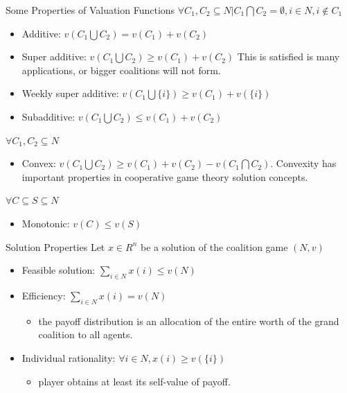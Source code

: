 \documentclass{beamer}
\begin{document}
\begin{frame}{Some Properties of Valuation Functions}
    $\forall C_1,C_2 \subseteq N | C_1 \bigcap C_2 = \emptyset, i \in N, i \notin C_1$
    \begin{itemize}
        \item {\color{blue} Additive:} $v(C_1 \bigcup C_2) = v(C_1) + v(C_2)$
        \item {\color{blue} Super additive:} $v(C_1 \bigcup C_2) \geq v(C_1) + v(C_2)$ This is satisfied is many applications, or bigger coalitions will not form.
        \item {\color{blue} Weekly super additive:} $v(C_1 \bigcup \{i\}) \geq v(C_1) + v(\{i\})$
        \item {\color{red} Subadditive:} $v(C_1 \bigcup C_2) \leq v(C_1) + v(C_2)$
    \end{itemize}

    $\forall C_1,C_2 \subseteq N$
    \begin{itemize}
        \item {\color{blue} Convex:} $v(C_1 \bigcup C_2) \geq v(C_1) + v(C_2) - v(C_1 \bigcap C_2)$. Convexity has important properties in cooperative game theory solution concepts.
    \end{itemize}

    $\forall C \subseteq S \subseteq N$
    \begin{itemize}
        \item {\color{blue} Monotonic:} $v(C) \leq v(S)$
    \end{itemize}
\end{frame}
\begin{frame}{Solution Properties}
    Let $x \in R^n$ be a solution of the coalition game $(N,v)$
    \begin{itemize}
        \item {\color{blue} Feasible solution:} $\sum_{i \in N} x(i) \leq v(N)$
        \item {\color{blue} Efficiency:} $\sum_{i \in N} x(i) = v(N)$
        \begin{itemize}
            \item the payoff distribution is an allocation of the entire worth of the grand coalition to all agents.
        \end{itemize}
        \item {\color{blue} Individual rationality:} $\forall i \in N, x(i) \geq v(\{i\})$
        \begin{itemize}
            \item player obtains at least its self-value of payoff.
        \end{itemize}
    \end{itemize}

\end{frame}
\end{document}
